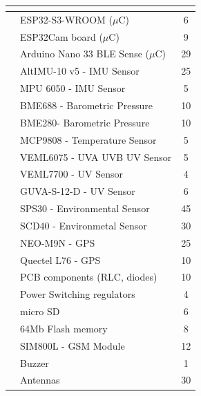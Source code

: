 \documentclass[11pt]{article}
\begin{document}
\begin{table}[htbp]
\centering
{}
\begin{tabular}{>{\centering\arraybackslash}p{4.5cm}>{\centering\arraybackslash}lc}
\rowcolor{CDOSRPrimary}
\hline
\multicolumn{1}{c}{\textbf{\color{white!50}{Category}}}& \multicolumn{1}{c}{\textbf{\color{white!50}{Cost Item}}} & \textbf{\color{white!50}{Cost \texteuro}} \\
\hline
\multicolumn{1}{l}{Hardware Parts (383\texteuro)}& ESP32-S3-WROOM ($\mu$C) & 6 \\
& \cellcolor{LightCyan1!50}ESP32Cam board ($\mu$C)& \cellcolor{LightCyan1!50}9 \\
& Arduino Nano 33 BLE Sense ($\mu$C)& 29 \\
& \cellcolor{LightCyan1!50}AltIMU-10 v5 - IMU Sensor & \cellcolor{LightCyan1!50}25 \\
& MPU 6050 - IMU Sensor & 5 \\
& \cellcolor{LightCyan1!50}BME688 - Barometric Pressure & \cellcolor{LightCyan1!50}10 \\
& BME280- Barometric Pressure & 10 \\
& \cellcolor{LightCyan1!50}MCP9808 - Temperature Sensor & \cellcolor{LightCyan1!50}5 \\
& VEML6075 - UVA UVB UV Sensor & 5 \\
& \cellcolor{LightCyan1!50}VEML7700 - UV Sensor & \cellcolor{LightCyan1!50}4 \\
& GUVA-S-12-D - UV Sensor & 6 \\
& \cellcolor{LightCyan1!50}SPS30 - Environmental Sensor & \cellcolor{LightCyan1!50}45 \\
& SCD40 - Environmetal Sensor & 30 \\
& \cellcolor{LightCyan1!50}NEO-M9N - GPS & \cellcolor{LightCyan1!50}25 \\
& Quectel L76 - GPS & 10 \\
& \cellcolor{LightCyan1!50}PCB components (RLC, diodes) & \cellcolor{LightCyan1!50}10 \\
& Power Switching regulators & 4 \\
& \cellcolor{LightCyan1!50}micro SD & \cellcolor{LightCyan1!50}6 \\
& 64Mb Flash memory & 8 \\
& \cellcolor{LightCyan1!50}SIM800L - GSM Module & \cellcolor{LightCyan1!50}12 \\
& Buzzer & 1 \\
& \cellcolor{LightCyan1!50}Antennas & \cellcolor{LightCyan1!50}30 \\

\end{tabular}
\end{table}
\end{document}
